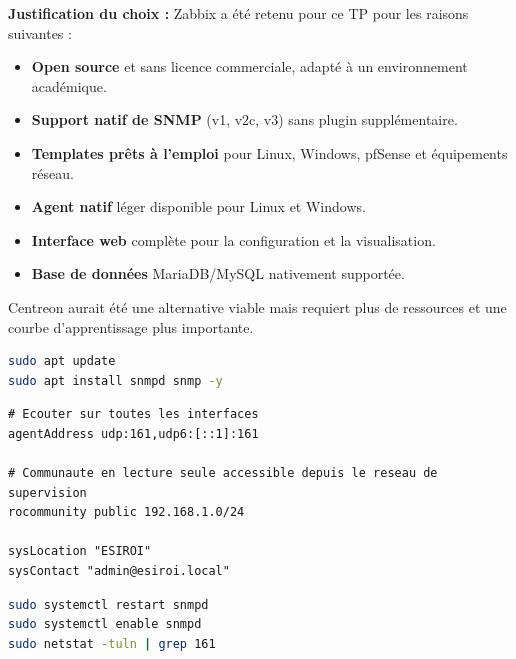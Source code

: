 \documentclass[a4paper,12pt,openany,oneside]{article}
\begin{document}
\newpage



\textbf{Justification du choix :} Zabbix a été retenu pour ce TP pour les raisons suivantes :

\begin{itemize}
    \item \textbf{Open source} et sans licence commerciale, adapté à un environnement académique.
    \item \textbf{Support natif de SNMP} (v1, v2c, v3) sans plugin supplémentaire.
    \item \textbf{Templates prêts à l'emploi} pour Linux, Windows, pfSense et équipements réseau.
    \item \textbf{Agent natif} léger disponible pour Linux et Windows.
    \item \textbf{Interface web} complète pour la configuration et la visualisation.
    \item \textbf{Base de données} MariaDB/MySQL nativement supportée.
\end{itemize}

Centreon aurait été une alternative viable mais requiert plus de ressources et une courbe d'apprentissage plus importante.



\begin{lstlisting}[language=bash]
sudo apt update
sudo apt install snmpd snmp -y
\end{lstlisting}


\begin{lstlisting}
# Ecouter sur toutes les interfaces
agentAddress udp:161,udp6:[::1]:161

# Communaute en lecture seule accessible depuis le reseau de supervision
rocommunity public 192.168.1.0/24

sysLocation "ESIROI"
sysContact "admin@esiroi.local"
\end{lstlisting}


\begin{lstlisting}[language=bash]
sudo systemctl restart snmpd
sudo systemctl enable snmpd
sudo netstat -tuln | grep 161
\end{lstlisting}
\end{document}
